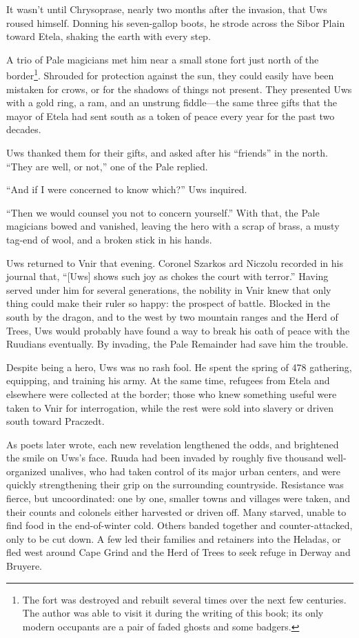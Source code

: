 \documentclass[12pt]{report}
\begin{document}
It wasn't until Chrysoprase, nearly two months after the invasion,
that Uws roused himself.  Donning his seven-gallop boots, he strode
across the Sibor Plain toward Etela, shaking the earth with every
step.

A trio of Pale magicians met him near a small stone fort just north of
the border\footnote{The fort was destroyed and rebuilt several times
over the next few centuries.  The author was able to visit it during
the writing of this book; its only modern occupants are a pair of
faded ghosts and some badgers.}.  Shrouded for protection against the
sun, they could easily have been mistaken for crows, or for the
shadows of things not present.  They presented Uws with a gold ring, a
ram, and an unstrung fiddle---the same three gifts that the mayor of
Etela had sent south as a token of peace every year for the past two
decades.

Uws thanked them for their gifts, and asked after his ``friends'' in the
north.  ``They are well, or not,'' one of the Pale replied.

``And if I were concerned to know which?'' Uws inquired.

``Then we would counsel you not to concern yourself.''  With that, the
Pale magicians bowed and vanished, leaving the hero with a scrap of
brass, a musty tag-end of wool, and a broken stick in his hands.

Uws returned to Vnir that evening.  Coronel Szarkos ard Niczolu
recorded in his journal that, ``[Uws] shows such joy as chokes the
court with terror.''  Having served under him for several generations,
the nobility in Vnir knew that only thing could make their ruler so
happy: the prospect of battle.  Blocked in the south by the dragon,
and to the west by two mountain ranges and the Herd of Trees, Uws
would probably have found a way to break his oath of peace with the
Ruudians eventually.  By invading, the Pale Remainder had save him the
trouble.

Despite being a hero, Uws was no rash fool.  He spent the spring of
478 gathering, equipping, and training his army.  At the same time,
refugees from Etela and elsewhere were collected at the border; those
who knew something useful were taken to Vnir for interrogation, while
the rest were sold into slavery or driven south toward Praczedt.

As poets later wrote, each new revelation lengthened the odds, and
brightened the smile on Uws's face.  Ruuda had been invaded by roughly
five thousand well-organized unalives, who had taken control of its
major urban centers, and were quickly strengthening their grip on the
surrounding countryside.  Resistance was fierce, but uncoordinated:
one by one, smaller towns and villages were taken, and their counts
and colonels either harvested or driven off.  Many starved, unable to
find food in the end-of-winter cold.  Others banded together and
counter-attacked, only to be cut down.  A few led their families and
retainers into the Heladas, or fled west around Cape Grind and the
Herd of Trees to seek refuge in Derway and Bruyere.
\end{document}
